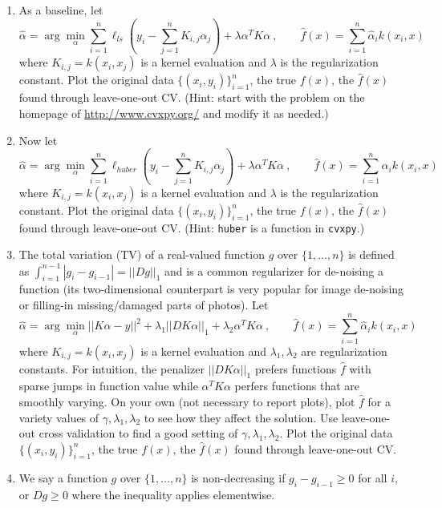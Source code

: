 \documentclass{article}
\newcommand{\1}{\mathbf{1}}
\begin{document}
\begin{enumerate}
  \item As a baseline, let
\[
  \widehat{\alpha} = \arg\min_\alpha \sum_{i=1}^n \ell_{ls}(y_i - \sum_{j=1}^n K_{i,j} \alpha_j) + \lambda \alpha^T K \alpha \ , \quad \quad \widehat{f}(x)=\sum_{i=1}^n \widehat{\alpha}_i k(x_i,x) 
\]
where $K_{i,j} = k(x_i,x_j)$ is a kernel evaluation and $\lambda$ is the regularization constant.
Plot the original data $\{(x_i,y_i)\}_{i=1}^n$, the true $f(x)$, the $\widehat{f}(x)$ found through leave-one-out CV.
(Hint: start with the problem on the homepage of \url{http://www.cvxpy.org/} and modify it as needed.)
\item Now let
\[
  \widehat{\alpha} = \arg\min_\alpha \sum_{i=1}^n \ell_{huber}(y_i - \sum_{j=1}^n K_{i,j} \alpha_j) + \lambda \alpha^T K \alpha \ , \quad \quad \widehat{f}(x)=\sum_{i=1}^n \widehat{\alpha}_i k(x_i,x) 
\]
where $K_{i,j} = k(x_i,x_j)$ is a kernel evaluation and $\lambda$ is the regularization constant.
Plot the original data $\{(x_i,y_i)\}_{i=1}^n$, the true $f(x)$, the $\widehat{f}(x)$ found through leave-one-out CV.
(Hint: \texttt{huber} is a function in \texttt{cvxpy}.)
  \item The total variation (TV) of a real-valued function $g$ over $\{1,\dots,n\}$ is defined as $\int_{i=1}^{n-1} |g_i - g_{i-1}| = || D g||_1$ and is a common regularizer for de-noising a function (its two-dimensional counterpart is very popular for image de-noising or filling-in missing/damaged parts of photos).   
  Let
\[
  \widehat{\alpha} = \arg\min_\alpha ||K\alpha - y||^2 + \lambda_1 ||D K \alpha||_1  + \lambda_2 \alpha^T K \alpha \ , \quad \quad \widehat{f}(x)=\sum_{i=1}^n \widehat{\alpha}_i k(x_i,x) 
\]
where $K_{i,j} = k(x_i,x_j)$ is a kernel evaluation and $\lambda_1, \lambda_2$ are regularization constants.
For intuition, the penalizer $||D K \alpha||_1$ prefers functions $\widehat{f}$ with sparse jumps in function value while $\alpha^T K \alpha$ perfers functions that are smoothly varying. 
On your own (not necessary to report plots), plot $\widehat{f}$ for a variety values of $\gamma, \lambda_1, \lambda_2$ to see how they affect the solution.
Use leave-one-out cross validation to find a good setting of $\gamma, \lambda_1, \lambda_2$. 
Plot the original data $\{(x_i,y_i)\}_{i=1}^n$, the true $f(x)$, the $\widehat{f}(x)$ found through leave-one-out CV.
\item We say a function $g$ over $\{1,\dots,n\}$ is non-decreasing if $g_i - g_{i-1} \geq 0$ for all $i$, or $D g \geq 0$ where the inequality applies elementwise.

\end{enumerate}
\end{document}
